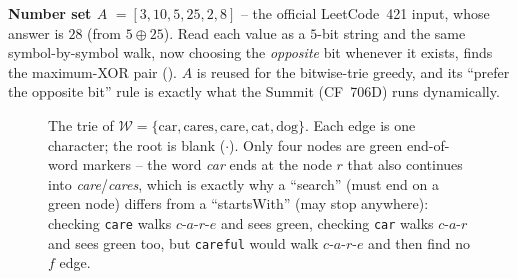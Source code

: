 \textbf{Number set $A$} $= [3, 10, 5, 25, 2, 8]$ -- the official LeetCode~421 input, whose answer is
$\boxed{28}$ (from $5\oplus 25$). Read each value as a $5$-bit string and the same symbol-by-symbol
walk, now choosing the \emph{opposite} bit whenever it exists, finds the maximum-XOR pair
(). $A$ is reused for the bitwise-trie greedy, and its ``prefer the opposite bit''
rule is exactly what the Summit (CF~706D) runs dynamically.

\begin{figure}[H]
\centering
{}
\caption{The trie of $\mathcal{W}=\{\text{car},\text{cares},\text{care},\text{cat},\text{dog}\}$. Each
edge is one character; the root is blank ($\cdot$). Only four nodes are green end-of-word markers -- the
word \emph{car} ends at the node $r$ that also continues into \emph{care}/\emph{cares}, which is exactly
why a ``search'' (must end on a green node) differs from a ``startsWith'' (may stop anywhere): checking
\texttt{care} walks $c$-$a$-$r$-$e$ and sees green, checking \texttt{car} walks $c$-$a$-$r$ and sees green
too, but \texttt{careful} would walk $c$-$a$-$r$-$e$ and then find no $f$ edge.}\label{fig:c08-wordstrie}
\end{figure}

